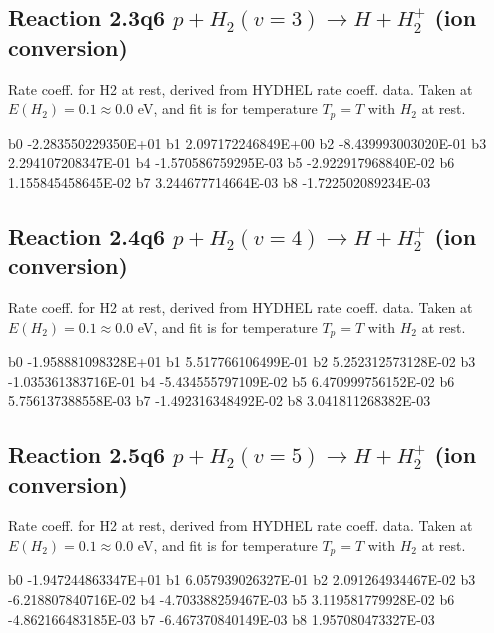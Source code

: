 \newpage
\subsection{
Reaction 2.3q6
$ p + H_2(v=3) \rightarrow H + H_2^+$ (ion conversion)
}
Rate coeff. for H2 at rest, derived from HYDHEL rate coeff. data.
Taken at $E(H_2) = 0.1 \approx 0.0$ eV,  and fit is for temperature $T_p=T$ with $H_2$ at rest.

\begin{{small}}\begin{{verbatim}}

  b0 -2.283550229350E+01  b1  2.097172246849E+00  b2 -8.439993003020E-01
  b3  2.294107208347E-01  b4 -1.570586759295E-03  b5 -2.922917968840E-02
  b6  1.155845458645E-02  b7  3.244677714664E-03  b8 -1.722502089234E-03

\end{{verbatim}}\end{{small}}

\newpage
\subsection{
Reaction 2.4q6
$ p + H_2(v=4) \rightarrow H + H_2^+$ (ion conversion)
}
Rate coeff. for H2 at rest, derived from HYDHEL rate coeff. data.
Taken at $E(H_2) = 0.1 \approx 0.0$ eV,  and fit is for temperature $T_p=T$ with $H_2$ at rest.

\begin{{small}}\begin{{verbatim}}

  b0 -1.958881098328E+01  b1  5.517766106499E-01  b2  5.252312573128E-02
  b3 -1.035361383716E-01  b4 -5.434555797109E-02  b5  6.470999756152E-02
  b6  5.756137388558E-03  b7 -1.492316348492E-02  b8  3.041811268382E-03

\end{{verbatim}}\end{{small}}

\newpage
\subsection{
Reaction 2.5q6
$ p + H_2(v=5) \rightarrow H + H_2^+$ (ion conversion)
}
Rate coeff. for H2 at rest, derived from HYDHEL rate coeff. data.
Taken at $E(H_2) = 0.1 \approx 0.0$ eV,  and fit is for temperature $T_p=T$ with $H_2$ at rest.

\begin{{small}}\begin{{verbatim}}

  b0 -1.947244863347E+01  b1  6.057939026327E-01  b2  2.091264934467E-02
  b3 -6.218807840716E-02  b4 -4.703388259467E-03  b5  3.119581779928E-02
  b6 -4.862166483185E-03  b7 -6.467370840149E-03  b8  1.957080473327E-03

\end{{verbatim}}\end{{small}}

